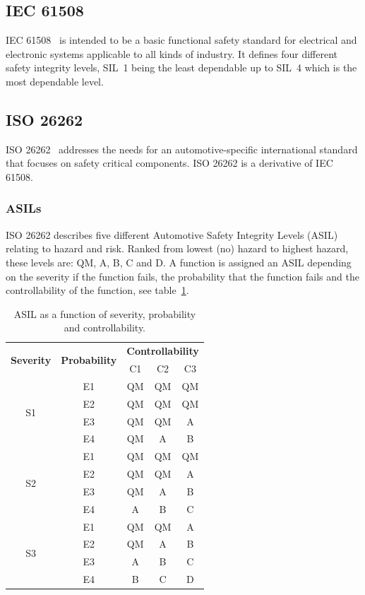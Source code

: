 \subsection{IEC 61508}
IEC 61508~\cite{IEC61508} is intended to be a basic functional safety standard for electrical and electronic systems applicable to all kinds of industry. It defines four different safety integrity levels, SIL~1 being the least dependable up to SIL~4 which is the most dependable level.

\subsection{ISO 26262}
ISO 26262~\cite{ISO26262} addresses the needs for an automotive-specific international standard that focuses on safety critical components. ISO 26262 is a derivative of IEC 61508.

\subsubsection{ASILs}
ISO 26262 describes five different Automotive Safety Integrity Levels (ASIL) relating to hazard and risk. Ranked from lowest (no) hazard to highest hazard, these levels are: QM, A, B, C and D. A function is assigned an ASIL depending on the severity if the function fails, the probability that the function fails and the controllability of the function, see table~\ref{table:ASIL}.

\begin{table}[H]
\centering
\begin{tabular}{|c|c|c|c|c|}
\hline
\multirow{2}{*}{\textbf{Severity}} &\multirow{2}{*}{\textbf{Probability}} &\multicolumn{3}{|c|}{\textbf{Controllability}} \\ \cline{3-5}
 & &C1 &C2 &C3 \\ \hline
\multirow{4}{*}{S1} & E1 & QM & QM & QM \\ \cline{2-5}
 & E2 & QM & QM & QM \\ \cline{2-5}
 & E3 & QM & QM & A \\ \cline{2-5}
 & E4 & QM & A & B \\ \hline
\multirow{4}{*}{S2} & E1 & QM & QM & QM \\ \cline{2-5}
 & E2 & QM & QM & A \\ \cline{2-5}
 & E3 & QM & A & B \\ \cline{2-5}
 & E4 & A & B & C \\ \hline
\multirow{4}{*}{S3} & E1 & QM & QM & A \\ \cline{2-5}
 & E2 & QM & A & B \\ \cline{2-5}
 & E3 & A & B & C \\ \cline{2-5}
 & E4 & B & C & D \\ \hline
\end{tabular}
\caption{ASIL as a function of severity, probability and controllability.}
\label{table:ASIL}
\end{table}

